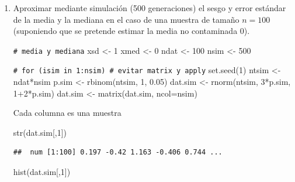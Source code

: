 \documentclass[
]{book}
\newenvironment{Shaded}{\begin{snugshade}}{\end{snugshade}}
\newcommand{\AttributeTok}[1]{\textcolor[rgb]{0.77,0.63,0.00}{#1}}
\newcommand{\CommentTok}[1]{\textcolor[rgb]{0.56,0.35,0.01}{\textit{#1}}}
\newcommand{\DecValTok}[1]{\textcolor[rgb]{0.00,0.00,0.81}{#1}}
\newcommand{\FloatTok}[1]{\textcolor[rgb]{0.00,0.00,0.81}{#1}}
\newcommand{\FunctionTok}[1]{\textcolor[rgb]{0.00,0.00,0.00}{#1}}
\newcommand{\NormalTok}[1]{#1}
\newcommand{\OtherTok}[1]{\textcolor[rgb]{0.56,0.35,0.01}{#1}}
\newcommand{\SpecialCharTok}[1]{\textcolor[rgb]{0.00,0.00,0.00}{#1}}
\theoremstyle{break}
\theoremstyle{nonumberplain}
\renewcommand{\CommentTok}[1]{\textcolor[rgb]{0.41,0.41,0.41}{\texttt{#1}}}
\begin{document}
\vspace{0.5cm}

\begin{enumerate}
\def\labelenumi{\alph{enumi})}
\item
  Aproximar mediante simulación (500 generaciones) el sesgo y
  error estándar de la media y la mediana en el caso de una
  muestra de tamaño \(n=100\) (suponiendo que se pretende estimar la
  media no contaminada 0).

\begin{Shaded}
\begin{Highlighting}[]
\CommentTok{\# media y mediana}
\NormalTok{xsd }\OtherTok{\textless{}{-}} \DecValTok{1}
\NormalTok{xmed }\OtherTok{\textless{}{-}} \DecValTok{0}
\NormalTok{ndat }\OtherTok{\textless{}{-}} \DecValTok{100}
\NormalTok{nsim }\OtherTok{\textless{}{-}} \DecValTok{500}

\CommentTok{\# for (isim in 1:nsim) \# evitar matrix y apply}
\FunctionTok{set.seed}\NormalTok{(}\DecValTok{1}\NormalTok{)}
\NormalTok{ntsim }\OtherTok{\textless{}{-}}\NormalTok{ ndat}\SpecialCharTok{*}\NormalTok{nsim}
\NormalTok{p.sim }\OtherTok{\textless{}{-}} \FunctionTok{rbinom}\NormalTok{(ntsim, }\DecValTok{1}\NormalTok{, }\FloatTok{0.05}\NormalTok{)}
\NormalTok{dat.sim }\OtherTok{\textless{}{-}} \FunctionTok{rnorm}\NormalTok{(ntsim, }\DecValTok{3}\SpecialCharTok{*}\NormalTok{p.sim, }\DecValTok{1}\SpecialCharTok{+}\DecValTok{2}\SpecialCharTok{*}\NormalTok{p.sim)}
\NormalTok{dat.sim }\OtherTok{\textless{}{-}} \FunctionTok{matrix}\NormalTok{(dat.sim, }\AttributeTok{ncol=}\NormalTok{nsim)}
\end{Highlighting}
\end{Shaded}

  Cada columna es una muestra

\begin{Shaded}
\begin{Highlighting}[]
\FunctionTok{str}\NormalTok{(dat.sim[,}\DecValTok{1}\NormalTok{])}
\end{Highlighting}
\end{Shaded}

\begin{verbatim}
##  num [1:100] 0.197 -0.42 1.163 -0.406 0.744 ...
\end{verbatim}

\begin{Shaded}
\begin{Highlighting}[]
\FunctionTok{hist}\NormalTok{(dat.sim[,}\DecValTok{1}\NormalTok{])}
\end{Highlighting}
\end{Shaded}


\end{enumerate}
\end{document}
